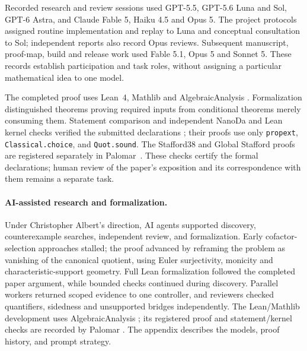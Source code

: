 Recorded research and review sessions used GPT-5.5, GPT-5.6 Luna and Sol,
GPT-6 Astra, and Claude Fable 5, Haiku 4.5 and Opus 5. The project protocols
assigned routine implementation and replay to Luna and conceptual
consultation to Sol; independent reports also record Opus reviews.
Subsequent manuscript, proof-map, build and release work used Fable 5.1,
Opus 5 and Sonnet 5. These records establish participation and task roles,
without assigning a particular mathematical idea to one model.

The completed proof uses Lean~4, Mathlib and AlgebraicAnalysis
\cite{Lean4,Mathlib2020,AlgebraicAnalysis030}.
Formalization distinguished theorems proving required inputs from
conditional theorems merely consuming them. Statement comparison and
independent NanoDa and Lean kernel checks verified the submitted declarations
\cite{Comparator,NanoDa,PalomarDocs}; their proofs use only
\texttt{propext}, \texttt{Classical.choice}, and \texttt{Quot.sound}.
The Stafford38 and Global Stafford proofs are registered separately in
Palomar~\cite{Stafford38Palomar2026,GlobalStaffordPalomar2026}.
These checks certify the formal declarations; human review of the paper's
exposition and its correspondence with them remains a separate task.

\else
\paragraph{AI-assisted research and formalization.}
Under Christopher Albert's direction, AI agents supported discovery,
counterexample searches, independent review, and formalization. Early
cofactor-selection approaches stalled; the proof advanced by reframing
the problem as vanishing of the canonical quotient, using Euler
surjectivity, monicity and characteristic-support geometry. Full Lean
formalization followed the completed paper argument, while bounded checks
continued during discovery. Parallel workers returned scoped evidence to
one controller, and reviewers checked quantifiers, sidedness and unsupported
bridges independently. The Lean/Mathlib development uses AlgebraicAnalysis
\cite{Lean4,Mathlib2020,AlgebraicAnalysis030}; its registered proof and
statement/kernel checks are recorded by Palomar
\cite{Stafford38Palomar2026,Comparator,NanoDa,PalomarDocs}.
The appendix describes the models, proof history, and prompt strategy.
\fi
